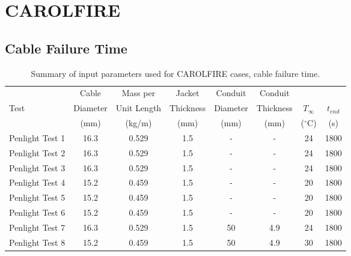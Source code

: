 \clearpage


\section{CAROLFIRE}

\subsection*{Cable Failure Time}

\begin{table}[!ht]
\caption[Input parameters for CAROLFIRE cases, cable failure time]
{Summary of input parameters used for CAROLFIRE cases, cable failure time.}

\begin{center}
\begin{tabular}{|l|c|c|c|c|c|c|c|}
\hline
                  &  Cable     &  Mass per     &  Jacket     &  Conduit   &  Conduit    &               &             \\
Test              &  Diameter  &  Unit Length  &  Thickness  &  Diameter  &  Thickness  &  $T_\infty$   &  $t_{end}$  \\
                  &  (mm)      &  (kg/m)       &  (mm)       &  (mm)      &  (mm)       &  ($^\circ$C)  &  (s)        \\ \hline \hline
Penlight Test 1   &  16.3      &  0.529        &  1.5        &  -         &  -          &  24           &  1800       \\ \hline
Penlight Test 2   &  16.3      &  0.529        &  1.5        &  -         &  -          &  24           &  1800       \\ \hline
Penlight Test 3   &  16.3      &  0.529        &  1.5        &  -         &  -          &  24           &  1800       \\ \hline
Penlight Test 4   &  15.2      &  0.459        &  1.5        &  -         &  -          &  20           &  1800       \\ \hline
Penlight Test 5   &  15.2      &  0.459        &  1.5        &  -         &  -          &  20           &  1800       \\ \hline
Penlight Test 6   &  15.2      &  0.459        &  1.5        &  -         &  -          &  20           &  1800       \\ \hline
Penlight Test 7   &  16.3      &  0.529        &  1.5        &  50        &  4.9        &  24           &  1800       \\ \hline
Penlight Test 8   &  15.2      &  0.459        &  1.5        &  50        &  4.9        &  30           &  1800       \\ \hline

\end{tabular}
\end{center}
\end{table}
